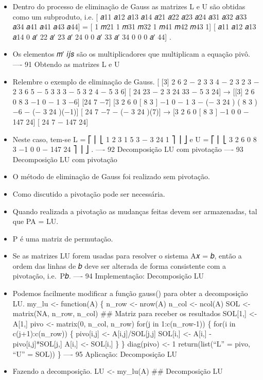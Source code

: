\documentclass[
]{article}
\begin{document}
\begin{itemize}
\item
  Dentro do processo de eliminação de Gauss as matrizes L e U são
  obtidas como um subproduto, i.e. {[} 𝑎11 𝑎12 𝑎13 𝑎14 𝑎21 𝑎22 𝑎23 𝑎24
  𝑎31 𝑎32 𝑎33 𝑎34 𝑎41 𝑎41 𝑎43 𝑎44{]} = {[} 1 𝑚21 1 𝑚31 𝑚32 1 𝑚41 𝑚42 𝑚43
  1{]} {[} 𝑎11 𝑎12 𝑎13 𝑎14 0 𝑎′ 22 𝑎′ 23 𝑎′ 24 0 0 𝑎′ 33 𝑎′ 34 0 0 0 𝑎′
  44{]} .
\item
  Os elementos 𝑚′ 𝑖𝑗𝑠 são os multiplicadores que multiplicam a equação
  pivô. ---- 91 Obtendo as matrizes L e U
\item
  Relembre o exemplo de eliminação de Gauss. {[} {[}3{]} 2 6 2 − 2 3 3 4
  − 2 3 2 3 − 2 3 6 5 − 5 3 3 3 − 5 3 2 4 − 5 3 6{]} {[} 24 23 − 2 3 24
  33 − 5 3 24{]} → {[}{[}3{]} 2 6 0 8 3 −1 0 − 1 3 −6{]} {[}24 7 −7{]}
  {[}3 2 6 0 {[} 8 3 {]} −1 0 − 1 3 − (− 3 24 ) ( 8 3 ) −6 − (− 3 24
  )(−1){]} {[} 24 7 −7 − (− 3 24 )(7){]} → {[}3 2 6 0 {[} 8 3 {]} −1 0 0
  − 147 24{]} {[} 24 7 − 147 24{]}
\item
  Neste caso, tem-se L = ⎡ ⎢ ⎣ 1 2 3 1 5 3 − 3 24 1 ⎤ ⎥ ⎦ e U = ⎡ ⎢ ⎣ 3
  2 6 0 8 3 −1 0 0 − 147 24 ⎤ ⎥ ⎦ . ---- 92 Decomposição LU com
  pivotação ---- 93 Decomposição LU com pivotação
\item
  O método de eliminação de Gauss foi realizado sem pivotação.
\item
  Como discutido a pivotação pode ser necessária.
\item
  Quando realizada a pivotação as mudanças feitas devem ser armazenadas,
  tal que PA = LU.
\item
  P é uma matriz de permutação.
\item
  Se as matrizes LU forem usadas para resolver o sistema A𝑥 = 𝑏, então a
  ordem das linhas de 𝑏 deve ser alterada de forma consistente com a
  pivotação, i.e.~P𝑏. ---- 94 Implementação: Decomposição LU
\item
  Podemos facilmente modificar a função gauss() para obter a
  decomposição LU. my\_lu \textless- function(A) \{ n\_row \textless-
  nrow(A) n\_col \textless- ncol(A) SOL \textless- matrix(NA, n\_row,
  n\_col) \#\# Matriz para receber os resultados SOL{[}1,{]} \textless-
  A{[}1,{]} pivo \textless- matrix(0, n\_col, n\_row) for(j in
  1:c(n\_row-1)) \{ for(i in c(j+1):c(n\_row)) \{ pivo{[}i,j{]}
  \textless- A{[}i,j{]}/SOL{[}j,j{]} SOL{[}i,{]} \textless- A{[}i,{]} -
  pivo{[}i,j{]}*SOL{[}j,{]} A{[}i,{]} \textless- SOL{[}i,{]} \} \}
  diag(pivo) \textless- 1 return(list(``L'' = pivo, ``U'' = SOL)) \}
  ---- 95 Aplicação: Decomposição LU
\item
  Fazendo a decomposição. LU \textless- my\_lu(A) \#\# Decomposição LU

\end{itemize}
\end{document}

